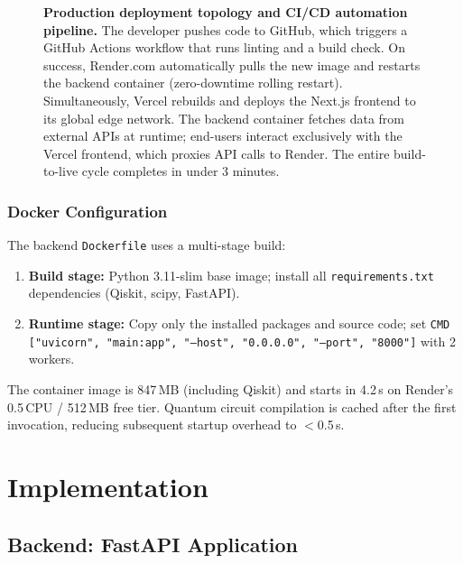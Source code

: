\documentclass[12pt,a4paper]{article}
\begin{document}
\begin{figure}[H]
\begin{tikzpicture}
\end{tikzpicture}
\caption[Production deployment and CI/CD pipeline]{%
  \textbf{Production deployment topology and CI/CD automation pipeline.}
  The developer pushes code to GitHub, which triggers a GitHub Actions
  workflow that runs linting and a build check. On success, Render.com
  automatically pulls the new image and restarts the backend container
  (zero-downtime rolling restart). Simultaneously, Vercel rebuilds and
  deploys the Next.js frontend to its global edge network. The backend
  container fetches data from external APIs at runtime; end-users interact
  exclusively with the Vercel frontend, which proxies API calls to Render.
  The entire build-to-live cycle completes in under 3 minutes.}
\label{fig:deployment}
\end{figure}

\subsubsection{Docker Configuration}
The backend \texttt{Dockerfile} uses a multi-stage build:
\begin{enumerate}[leftmargin=*]
\item \textbf{Build stage:} Python 3.11-slim base image; install all
      \texttt{requirements.txt} dependencies (Qiskit, scipy, FastAPI).
\item \textbf{Runtime stage:} Copy only the installed packages and source
      code; set \texttt{CMD ["uvicorn", "main:app", "--host", "0.0.0.0",
      "--port", "8000"]} with 2 workers.
\end{enumerate}

\noindent The container image is 847\,MB (including Qiskit) and starts
in 4.2\,s on Render's 0.5\,CPU / 512\,MB free tier. Quantum circuit
compilation is cached after the first invocation, reducing subsequent
startup overhead to $<$0.5\,s.

\clearpage
\section{Implementation}
\label{sec:implementation}

\subsection{Backend: FastAPI Application}
\label{sec:impl:backend}
\end{document}
